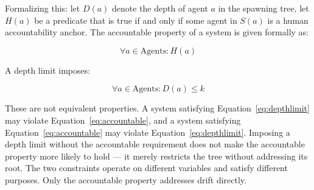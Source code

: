 \documentclass[12pt]{article}
\begin{document}
Formalizing this: let $D(a)$ denote the depth of agent $a$ in the spawning tree, let $H(a)$ be a predicate that is true if and only if some agent in $S(a)$ is a human accountability anchor. The accountable property of a system is given formally as:

\begin{equation}
\label{eq:accountable}
\forall a \in \text{Agents}: H(a)
\end{equation}

A depth limit imposes:

\begin{equation}
\label{eq:depthlimit}
\forall a \in \text{Agents}: D(a) \leq k
\end{equation}

These are not equivalent properties. A system satisfying Equation~\ref{eq:depthlimit} may violate Equation~\ref{eq:accountable}, and a system satisfying Equation~\ref{eq:accountable} may violate Equation~\ref{eq:depthlimit}. Imposing a depth limit without the accountable requirement does not make the accountable property more likely to hold — it merely restricts the tree without addressing its root. The two constraints operate on different variables and satisfy different purposes. Only the accountable property addresses drift directly.
\end{document}
